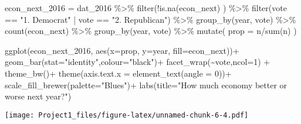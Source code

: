\documentclass[
]{article}
\newenvironment{Shaded}{\begin{snugshade}}{\end{snugshade}}
\newcommand{\AttributeTok}[1]{\textcolor[rgb]{0.77,0.63,0.00}{#1}}
\newcommand{\DecValTok}[1]{\textcolor[rgb]{0.00,0.00,0.81}{#1}}
\newcommand{\FunctionTok}[1]{\textcolor[rgb]{0.00,0.00,0.00}{#1}}
\newcommand{\NormalTok}[1]{#1}
\newcommand{\OtherTok}[1]{\textcolor[rgb]{0.56,0.35,0.01}{#1}}
\newcommand{\SpecialCharTok}[1]{\textcolor[rgb]{0.00,0.00,0.00}{#1}}
\newcommand{\StringTok}[1]{\textcolor[rgb]{0.31,0.60,0.02}{#1}}
\begin{document}
\begin{Shaded}
\begin{Highlighting}[]
\NormalTok{econ\_next\_2016 }\OtherTok{=}\NormalTok{ dat\_2016 }\SpecialCharTok{\%\textgreater{}\%}
  \FunctionTok{filter}\NormalTok{(}\SpecialCharTok{!}\FunctionTok{is.na}\NormalTok{(econ\_next) ) }\SpecialCharTok{\%\textgreater{}\%}
  \FunctionTok{filter}\NormalTok{(vote }\SpecialCharTok{==} \StringTok{"1. Democrat"} \SpecialCharTok{|}\NormalTok{ vote }\SpecialCharTok{==} \StringTok{"2. Republican"}\NormalTok{) }\SpecialCharTok{\%\textgreater{}\%}
  \FunctionTok{group\_by}\NormalTok{(year, vote) }\SpecialCharTok{\%\textgreater{}\%}
  \FunctionTok{count}\NormalTok{(econ\_next) }\SpecialCharTok{\%\textgreater{}\%}
  \FunctionTok{group\_by}\NormalTok{(year, vote) }\SpecialCharTok{\%\textgreater{}\%}
  \FunctionTok{mutate}\NormalTok{(}
    \AttributeTok{prop =}\NormalTok{ n}\SpecialCharTok{/}\FunctionTok{sum}\NormalTok{(n)}
\NormalTok{  )}

\FunctionTok{ggplot}\NormalTok{(econ\_next\_2016,}
       \FunctionTok{aes}\NormalTok{(}\AttributeTok{x=}\NormalTok{prop, }\AttributeTok{y=}\NormalTok{year, }\AttributeTok{fill=}\NormalTok{econ\_next))}\SpecialCharTok{+}
  \FunctionTok{geom\_bar}\NormalTok{(}\AttributeTok{stat=}\StringTok{"identity"}\NormalTok{,}\AttributeTok{colour=}\StringTok{"black"}\NormalTok{)}\SpecialCharTok{+}
  \FunctionTok{facet\_wrap}\NormalTok{(}\SpecialCharTok{\textasciitilde{}}\NormalTok{vote,}\AttributeTok{ncol=}\DecValTok{1}\NormalTok{) }\SpecialCharTok{+}
  \FunctionTok{theme\_bw}\NormalTok{()}\SpecialCharTok{+}
  \FunctionTok{theme}\NormalTok{(}\AttributeTok{axis.text.x =} \FunctionTok{element\_text}\NormalTok{(}\AttributeTok{angle =} \DecValTok{0}\NormalTok{))}\SpecialCharTok{+}
  \FunctionTok{scale\_fill\_brewer}\NormalTok{(}\AttributeTok{palette=}\StringTok{"Blues"}\NormalTok{)}\SpecialCharTok{+}
  \FunctionTok{labs}\NormalTok{(}\AttributeTok{title=}\StringTok{"How much economy better or worse next year?"}\NormalTok{)}
\end{Highlighting}
\end{Shaded}

\texttt{[image: Project1\_files/figure-latex/unnamed-chunk-6-4.pdf]}
\end{document}
